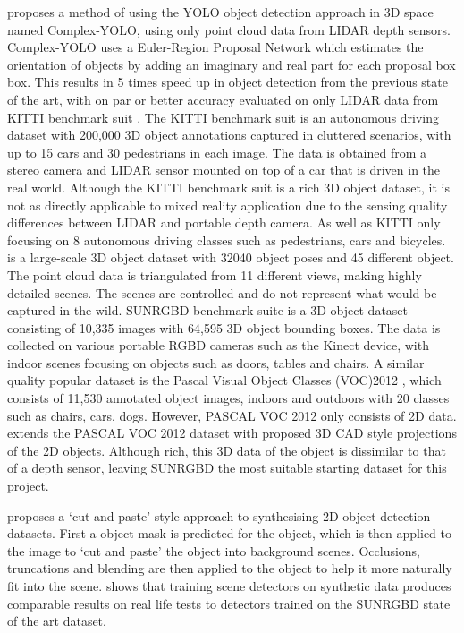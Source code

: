 \documentclass[11pt]{article}
\begin{document}
{\cite{complex_YOLO} proposes a method of using the YOLO object detection approach in 3D space named Complex-YOLO, using only point cloud data from LIDAR depth sensors. Complex-YOLO uses a Euler-Region Proposal Network which estimates the orientation of objects by adding an imaginary and real part for each proposal box box. This results in 5 times speed up in object detection from the previous state of the art, with on par or better accuracy evaluated on only LIDAR data from KITTI benchmark suit \cite{KITTI}. The KITTI benchmark suit is an autonomous driving dataset with 200,000 3D object annotations captured in cluttered scenarios, with up to 15 cars and 30 pedestrians in each image. The data is obtained from a stereo camera and LIDAR sensor mounted on top of a car that is driven in the real world. Although the KITTI benchmark suit is a rich 3D object dataset, it is not as directly applicable to mixed reality application due to the sensing quality differences between LIDAR and portable depth camera. As well as KITTI only focusing on 8 autonomous driving classes such as pedestrians, cars and bicycles. \cite{3D_dataset} is a large-scale 3D object dataset with 32040 object poses and 45 different
object. The point cloud data is triangulated from 11 different views, making highly detailed scenes. The scenes are controlled and do not represent what would be captured in the wild. SUNRGBD benchmark suite \cite{SUNRGBD} is a 3D object dataset consisting of 10,335 images with 64,595 3D object bounding boxes. The data is collected on various portable RGBD cameras such as the Kinect device, with indoor scenes focusing on objects such as doors, tables and chairs. A similar quality popular dataset is the Pascal Visual Object Classes (VOC)2012 \cite{pascal-voc-2012}, which consists of 11,530 annotated object images, indoors and outdoors with 20 classes such as chairs, cars, dogs. However, PASCAL VOC 2012 only consists of 2D data. \cite{PASCAL_3D} extends the PASCAL VOC 2012 dataset with proposed 3D CAD style projections of the 2D objects. Although rich, this 3D data of the object is dissimilar to that of a depth sensor, leaving SUNRGBD the most suitable starting dataset for this project.

\cite{cut_paste} proposes a `cut and paste' style approach to synthesising 2D object detection datasets. First a object mask is predicted for the object, which is then applied to the image to `cut and paste' the object into background scenes. Occlusions, truncations and blending are then applied to the object to help it more naturally fit into the scene. \cite{synthetic_train} shows that training scene detectors on synthetic data produces comparable results on real life tests to detectors trained on the SUNRGBD state of the art dataset.

}
\end{document}
